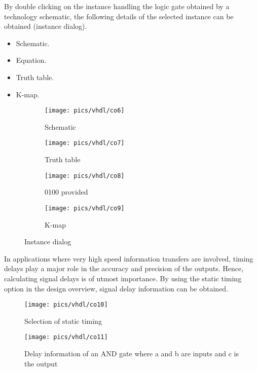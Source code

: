 \noindent
 By double clicking on the instance handling the logic gate obtained by a technology schematic, the following details of the selected instance can be obtained (instance dialog).
 \begin{itemize}
 	\item Schematic.
 	\item Equation.
 	\item Truth table.
 	\item K-map.
 \end{itemize}
 
 \begin{figure}[!h]
 	\centering
 	\begin{subfigure}{.5\textwidth}
 		\centering
 		\texttt{[image: pics/vhdl/co6]}
 		\caption{Schematic}
 		\label{fig:NewFile3}
 	\end{subfigure}%
 	\begin{subfigure}{.5\textwidth}
 		\centering
 		\texttt{[image: pics/vhdl/co7]}
 		\caption{Truth table}
 		\label{fig:NewFile4}
 	\end{subfigure}
 	\begin{subfigure}{.5\textwidth}
 		\centering
 		\texttt{[image: pics/vhdl/co8]}
 		\caption{0100 provided}
 		\label{fig:NewFile5}
 	\end{subfigure}%
 	\begin{subfigure}{.5\textwidth}
 		\centering
 		\texttt{[image: pics/vhdl/co9]}
 		\caption{K-map}
 		\label{fig:NewFile6}
 	\end{subfigure}
 	\caption{Instance dialog}
 	\label{fig:NewFile}
 \end{figure}

\noindent
In applications where very high speed information transfers are involved, timing delays play a major role in the accuracy and precision of the outputs. Hence, calculating signal delays is of utmost importance. By using the static timing option in the design overview, signal delay information can be obtained.

\pagebreak

\begin{figure}[h!]
	\centering
	\texttt{[image: pics/vhdl/co10]}
	\caption{Selection of static timing}
	\label{fig:co10}
\end{figure}

\begin{figure}[h!]
	\centering
	\texttt{[image: pics/vhdl/co11]}
	\caption{Delay information of an AND gate where a and b are inputs and c is the output}
	\label{fig:co11}
\end{figure}

